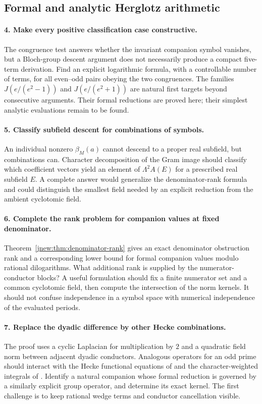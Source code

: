 \subsection{Formal and analytic Herglotz arithmetic}

\paragraph{4. Make every positive classification case constructive.}
The congruence test answers whether the invariant companion symbol
vanishes, but a Bloch-group descent argument does not necessarily
produce a compact five-term derivation. Find an explicit logarithmic
formula, with a controllable number of terms, for all even--odd pairs
obeying the two congruences. The families
$J(e/(e^2-1))$ and $J(e/(e^2+1))$ are natural first targets beyond
consecutive arguments. Their formal reductions are proved here;
their simplest analytic evaluations remain to be found.

\paragraph{5. Classify subfield descent for combinations of symbols.}
An individual nonzero $\beta_M(a)$ cannot descend to a proper real
subfield, but combinations can. Character decomposition of the Gram
image should classify which coefficient vectors yield an element of
$\Lambda^2A(E)$ for a prescribed real subfield $E$. A complete answer
would generalize the denominator-rank formula and could distinguish
the smallest field needed by an explicit reduction from the ambient
cyclotomic field.

\paragraph{6. Complete the rank problem for companion values at fixed denominator.}
Theorem~\ref{jnew:thm:denominator-rank} gives an exact denominator
obstruction rank and a corresponding lower bound for formal companion
values modulo rational dilogarithms. What additional rank is supplied
by the numerator-conductor blocks? A useful formulation should fix a
finite numerator set and a common cyclotomic field, then compute the
intersection of the norm kernels. It should not confuse independence
in a symbol space with numerical independence of the evaluated periods.

\paragraph{7. Replace the dyadic difference by other Hecke combinations.}
The proof uses a cyclic Laplacian for multiplication by $2$ and a
quadratic field norm between adjacent dyadic conductors. Analogous
operators for an odd prime should interact with the Hecke functional
equations of \cite{RadchenkoZagier} and the character-weighted integrals
of \cite{DixitSathyanarayanaSharan2024}. Identify a natural companion
whose formal reduction is governed by a similarly explicit group
operator, and determine its exact kernel. The first challenge is to
keep rational wedge terms and conductor cancellation visible.


